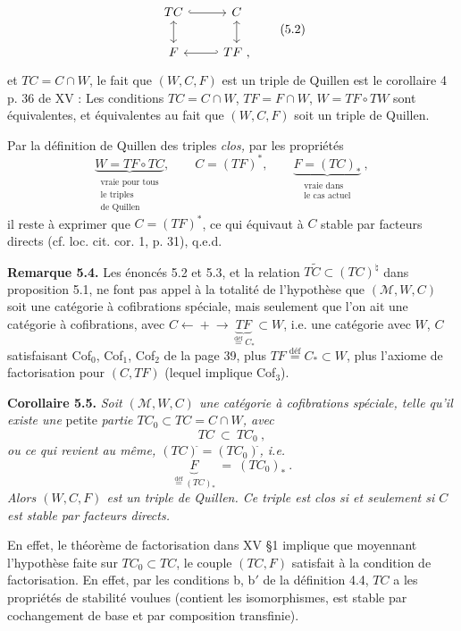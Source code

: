 \documentclass[11pt]{article}
\newcommand{\printedpage}[1]{\marginpar{\footnotesize p.~#1}}
\newcommand{\msp}[1]{\marginpar{\footnotesize [#1]}}
\newcommand{\cl}{^{\tilde{}}}%
\newcommand{\defeq}{\overset{\text{déf}}{=}}
\begin{document}
\printedpage{44}
\[
\begin{tikzcd}
TC \arrow[r, hook] \arrow[d, leftrightarrow] & C \arrow[d, leftrightarrow] \\
F & TF \arrow[l, hook'] \ ,
\end{tikzcd}
\tag*{(5.2)}
\]
et $TC = C \cap W$, le fait que $(W, C, F)$ est un triple de Quillen est le corollaire 4 p. 36 de XV : Les conditions $TC = C \cap W$, $TF = F \cap W$, $W = TF \circ TW$ sont équivalentes, et équivalentes au fait que $(W, C, F)$ soit un triple de Quillen.

Par la définition de Quillen des triples \textit{clos,} par les propriétés
\[
\underbrace{W = TF \circ TC}_{\substack{\text{vraie pour tous}\\ \text{le triples}\\ \text{de Quillen}}}, \qquad C = (TF)^*, \qquad \underbrace{F = (TC)_*}_{\substack{\text{vraie dans}\\ \text{le cas actuel}}}\ , %
\]
il reste à exprimer que $C = (TF)^*$, ce qui équivaut à $C$ stable par facteurs directs (cf. loc. cit. cor. 1, p. 31), q.e.d.

\textbf{Remarque 5.4.} Les énoncés 5.2 et 5.3, et la relation $T\tilde{C} \subset (TC)^\natural$ dans proposition 5.1, ne font pas appel à la totalité de l'hypothèse que $(\mathcal{M}, W, C)$ soit une catégorie à cofibrations spéciale, mais seulement que l'on ait une catégorie à cofibrations, avec $C \mathrel{\leftarrow\!\!\!+\!\!\!\rightarrow} \underbrace{TF}_{\defeq C_*} \subset W$, %
\msp{page 89}
i.e. une catégorie avec $W$, $C$ satisfaisant Cof$_0$, Cof$_1$, Cof$_2$ de la page 39, plus $TF \defeq C_* \subset W$, plus l'axiome de factorisation pour $(C, TF)$ (lequel implique Cof$_3$).

\textbf{Corollaire 5.5.} \textit{Soit $(\mathcal{M}, W, C)$ une catégorie à cofibrations spéciale, telle qu'il existe une} petite \textit{partie $TC_0 \subset TC = C \cap W$, avec}
\[
TC \ \subset \ TC_0\cl\ ,
\tag*{(5.5.1)}
\]
\textit{ou ce qui revient au même, $(TC)\cl = (TC_0)\cl$, i.e.}
\[
\underbrace{F}_{\defeq (TC)_*} \ = \ (TC_0)_*\ .
\tag*{(5.5.2)}
\]
\textit{Alors $(W, C, F)$ est un triple de Quillen. Ce triple est clos si et seulement si $C$ est stable par facteurs directs.}

En effet, le théorème de factorisation dans XV §1 implique que moyennant l'hypothèse faite sur $TC_0 \subset TC$, le couple $(TC, F)$ satisfait à la condition de factorisation. En effet, par les conditions b, b$'$ de la définition 4.4, $TC$ a les propriétés de stabilité voulues (contient les isomorphismes, est stable par cochangement de base et par composition transfinie).
\end{document}

